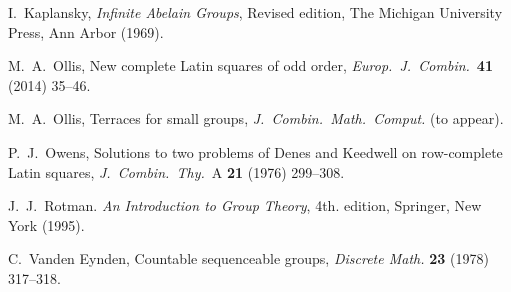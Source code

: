 \documentclass[12pt,a4paper]{article}
\newcommand{\Z}{\mathbb{Z}}
\begin{document}
\begin{thebibliography}{99}
I.~Kaplansky, {\em Infinite Abelain Groups}, Revised edition, The Michigan University Press, Ann Arbor (1969).






M.~A.~Ollis, New complete Latin squares of odd order, {\em Europ.~J.~Combin.}~{\bf 41} (2014) 35--46.

M.~A.~Ollis, Terraces for small groups, {\em J.~Combin.~Math.~Comput.} (to appear).

P.~J.~Owens,  Solutions to two problems of Denes and Keedwell on row-complete
Latin squares, {\em J.~Combin.~Thy.}~A {\bf 21} (1976) 299--308.

J.~J.~Rotman. {\em An Introduction to Group Theory}, 4th. edition, Springer, New York (1995).




C.~Vanden Eynden, Countable sequenceable groups, {\em Discrete Math.} {\bf 23} (1978) 317--318.








\end{thebibliography}
\end{document}
